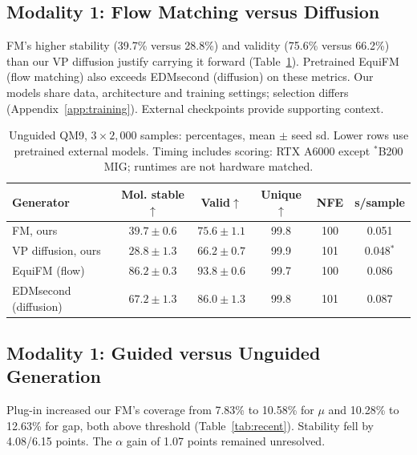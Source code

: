 \documentclass{article}
\begin{document}
\subsection{Modality 1: Flow Matching versus Diffusion}\label{sec:fmvd}
FM's higher stability (39.7\% versus 28.8\%) and validity (75.6\% versus 66.2\%) than our VP diffusion justify carrying it forward (Table~\ref{tab:fmvd}). Pretrained EquiFM (flow matching) also exceeds EDMsecond (diffusion) on these metrics. Our models share data, architecture and training settings; selection differs (Appendix~\ref{app:training}). External checkpoints provide supporting context.
\begin{table}[!htbp]
\centering\small
\caption{Unguided QM9, $3\times2{,}000$ samples: percentages, mean $\pm$ seed sd. Lower rows use pretrained external models. Timing includes scoring: RTX A6000 except $^*$B200 MIG; runtimes are not hardware matched.}
\label{tab:fmvd}
\begin{tabular}{lccccc}
\toprule
Generator & Mol. stable$\uparrow$ & Valid$\uparrow$ & Unique$\uparrow$ & NFE & s/sample\\
\midrule
FM, ours & $39.7\pm0.6$ & $75.6\pm1.1$ & 99.8 & 100 & 0.051\\
VP diffusion, ours & $28.8\pm1.3$ & $66.2\pm0.7$ & 99.9 & 101 & 0.048$^{*}$\\
\midrule
EquiFM (flow) & $86.2\pm0.3$ & $93.8\pm0.6$ & 99.7 & 100 & 0.086\\
EDMsecond (diffusion) & $67.2\pm1.3$ & $86.0\pm1.3$ & 99.8 & 101 & 0.087\\
\bottomrule
\end{tabular}
\end{table}

\subsection{Modality 1: Guided versus Unguided Generation}\label{sec:guidworks}
Plug-in increased our FM's coverage from 7.83\% to 10.58\% for $\mu$ and 10.28\% to 12.63\% for gap, both above threshold (Table~\ref{tab:recent}). Stability fell by 4.08/6.15 points. The $\alpha$ gain of 1.07 points remained unresolved.
\end{document}
